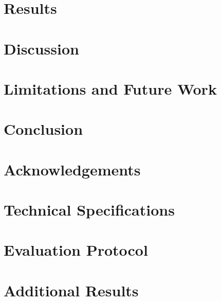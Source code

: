 \documentclass[10pt, twocolumn, letterpaper]{article}
\begin{document}
\section{Results}
\label{sec:results}


\section{Discussion}
\label{sec:discussion}


\section{Limitations and Future Work}
\label{sec:limitations}


\section{Conclusion}
\label{sec:conclusion}


\section*{Acknowledgements}
\label{sec:acknowledgements}





\appendix

\section{Technical Specifications}
\label{app:specs}


\section{Evaluation Protocol}
\label{app:protocol}


\section{Additional Results}
\label{app:additional}

\end{document}
